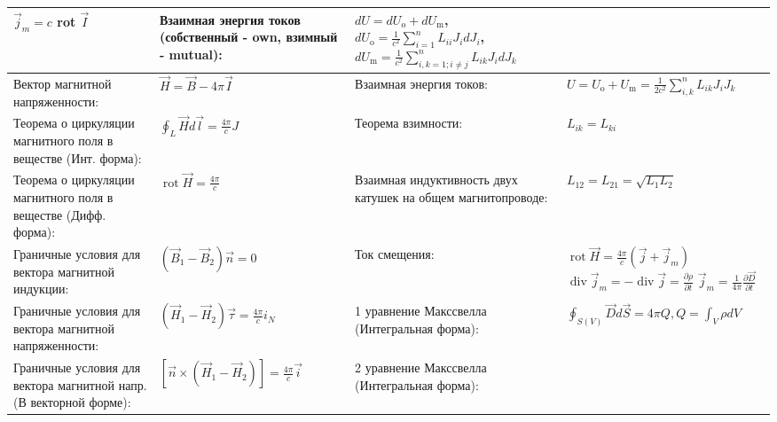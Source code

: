 \documentclass{article}
\begin{document}
\begin{tabular}{ |p{6cm}|p{3.5cm}|p{6cm}|p{3.5cm}|  }
$\vec{j}_{m}=c$ rot $\vec{I}$                                              &
Взаимная энергия токов (собственный - own, взимный - mutual):              &
$d U=d U_{\mathrm{o}}+d U_{\mathrm{m}}$,
$d U_{\mathrm{o}}=\frac{1}{c^{2}} \sum_{i=1}^{n} L_{i i} J_{i} d J_{i}$,
$d U_{\mathrm{m}}=\frac{1}{c^{2}} \sum_{i, k=1 ; i \neq j}^{n} L_{i k} J_{i} d J_{k}$\\
\hline
Вектор магнитной напряженности:                                            &
$\vec{H}=\vec{B} - 4 \pi \vec{I}$                                          &
Взаимная энергия токов:                                                    &
$U=U_{\mathrm{o}}+U_{\mathrm{m}}=\frac{1}{2 c^{2}} \sum_{i, k}^{n} L_{i k} J_{i} J_{k}$ \\
\hline
Теорема о циркуляции магнитного поля в веществе (Инт. форма):              &
$\oint_{L} \vec{H} d \vec{l}=\frac{4 \pi}{c} J$                            &
Теорема взимности:                                                         &
$L_{i k}=L_{k i}$                                                          \\
\hline
Теорема о циркуляции магнитного поля в веществе (Дифф. форма):             &
$\operatorname{rot} \vec{H}=\frac{4 \pi}{c}$                               &
Взаимная индуктивность двух катушек на общем магнитопроводе:               &
$L_{12}=L_{21}=\sqrt{L_{1} L_{2}}$                                         \\
\hline
Граничные условия для вектора магнитной индукции:                          &
$\left(\vec{B}_{1}-\vec{B}_{2}\right) \vec{n}=0$                           &
Ток смещения:                                                              &
$\operatorname{rot} \vec{H}=\frac{4 \pi}{c}\left(\vec{j}+\vec{j}_{m}\right)$
$\operatorname{div} \vec{j}_{m}=-\operatorname{div} \vec{j}=\frac{\partial \rho}{\partial t}$
$\vec{j}_{m}=\frac{1}{4 \pi} \frac{\partial \vec{D}}{\partial t}$          \\
\hline
Граничные условия для вектора магнитной напряженности:                     &
$\left(\vec{H}_{1}-\vec{H}_{2}\right) \vec{\tau}= \frac{4 \pi}{c} i_{N}$   &
1 уравнение Макссвелла (Интегральная форма):                               &
$\oint_{S(V)} \vec{D} d \vec{S}=4 \pi Q, Q=\int_{V} \rho d V$              \\
\hline
Граничные условия для вектора магнитной напр. (В векторной форме):         &
$[\vec{n} \times \left(\vec{H}_{1}-\vec{H}_{2}\right)]=\frac{4 \pi}{c} \vec{i}$ &
2 уравнение Макссвелла (Интегральная форма):                               &

\end{tabular}
\end{document}
